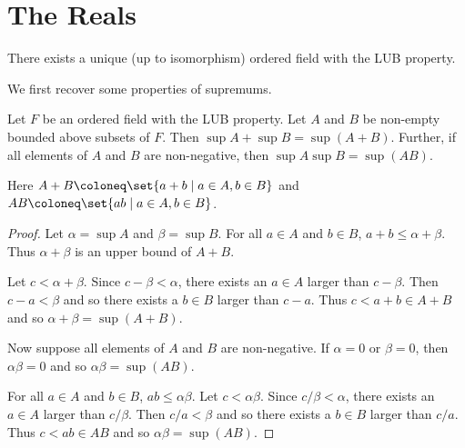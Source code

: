 \section{The Reals} \label{sec:R}
\vspace{0.5em}
\begin{theorem} \label{thm:R:unique}
    There exists a unique (up to isomorphism) ordered field with the LUB
    property.
\end{theorem}
We first recover some properties of supremums.
\begin{lemma} \label{thm:R:sup}
    Let $F$ be an ordered field with the LUB property.
    Let $A$ and $B$ be non-empty bounded above subsets of $F$.
    Then $\sup A + \sup B = \sup (A + B)$.
    Further, if all elements of $A$ and $B$ are non-negative, then
    $\sup A \sup B = \sup (A B)$.

    Here $A + B \coloneq \set{a + b \mid a \in A, b \in B}$ and
    $A B \coloneq \set{ab \mid a \in A, b \in B}$.
\end{lemma}
\begin{proof}
    Let $\alpha = \sup A$ and $\beta = \sup B$.
    For all $a \in A$ and $b \in B$, $a + b \le \alpha + \beta$.
    Thus $\alpha + \beta$ is an upper bound of $A + B$.

    Let $c < \alpha + \beta$.
    Since $c - \beta < \alpha$, there exists an $a \in A$ larger than
    $c - \beta$.
    Then $c - a < \beta$ and so there exists a $b \in B$ larger than
    $c - a$.
    Thus $c < a + b \in A + B$ and so $\alpha + \beta = \sup (A + B)$.

    Now suppose all elements of $A$ and $B$ are non-negative.
    If $\alpha = 0$ or $\beta = 0$, then $\alpha \beta = 0$ and so
    $\alpha \beta = \sup (A B)$.

    For all $a \in A$ and $b \in B$, $ab \le \alpha \beta$.
    Let $c < \alpha \beta$.
    Since $c/\beta < \alpha$, there exists an $a \in A$ larger than
    $c/\beta$.
    Then $c/a < \beta$ and so there exists a $b \in B$ larger than
    $c/a$.
    Thus $c < ab \in A B$ and so $\alpha \beta = \sup (A B)$.
\end{proof}

